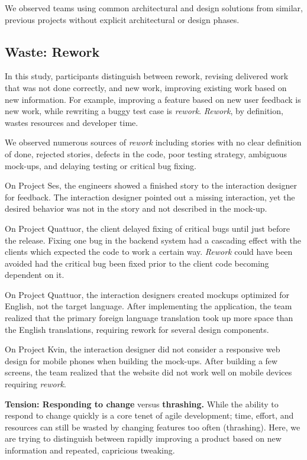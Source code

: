 We observed teams using common architectural and design solutions from similar, previous projects without explicit architectural or design phases.
\subsection{Waste: Rework}
In this study, participants distinguish between rework, revising delivered work that was not done correctly, and new work, improving existing work based on new information. For example, improving a feature based on new user feedback is new work, while rewriting a buggy test case is \textit{rework}.  \textit{Rework}, by definition, wastes resources and developer time. 

We observed numerous sources of \textit{rework} including stories with no clear definition of done, rejected stories, defects in the code, poor testing strategy, ambiguous mock-ups, and delaying testing or critical bug fixing.

On Project Ses, the engineers showed a finished story to the interaction designer for feedback. The interaction designer pointed out a missing interaction, yet the desired behavior was not in the story and not described in the mock-up.

On Project Quattuor, the client delayed fixing of critical bugs until just before the release. Fixing one bug in the backend system had a cascading effect with the clients which expected the code to work a certain way. \textit{Rework} could have been avoided had the critical bug been fixed prior to the client code becoming dependent on it.

On Project Quattuor, the interaction designers created mockups optimized for English, not the target language. After implementing the application, the team realized that the primary foreign language translation took up more space than the English translations, requiring rework for several design components. 

On Project Kvin, the interaction designer did not consider a responsive web design for mobile phones when building the mock-ups. After building a few screens, the team realized that the website did not work well on mobile devices requiring \textit{rework}.

\textbf{Tension: Responding to change} versus \textbf{thrashing.}
While the ability to respond to change quickly is a core tenet of agile development; time, effort, and resources can still be wasted by changing features too often (thrashing). Here, we are trying to distinguish between rapidly improving a product based on new information and repeated, capricious tweaking. 

